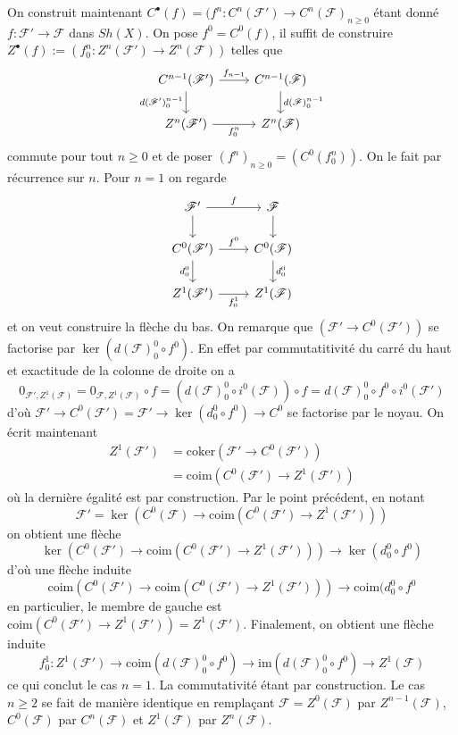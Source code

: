 \documentclass[a4paper,12pt]{article}
\newcommand{\F}{\mathscr F}
\newcommand{\im}{\textrm{im}}
\newcommand{\coker}{\textrm{coker}}
\newcommand{\coim}{\textrm{coim}}
\theoremstyle{plain}
\theoremstyle{definition}
\theoremstyle{remark}
\begin{document}
On construit maintenant 
$C^\bullet(f)=(f^n\colon C^n(\F')\to C^n(\F)_{n\geq 0}$ 
étant donné $f \colon \F'\to \F$ dans $Sh(X)$. On pose
$f^0=C^0(f)$, il suffit de construire $Z^\bullet(f):=
(f_0^n\colon Z^n(\F')\to Z^n(\F))$ telles que 
\[\begin{tikzcd}
	{C^{n-1}(\F')} & {C^{n-1}(\F)} \\
	{Z^n(\F')} & {Z^n(\F)}
	\arrow["{f_{n-1}}", from=1-1, to=1-2]
	\arrow["{d(\F')_0^{n-1}}"', from=1-1, to=2-1]
	\arrow["{d(\F)_0^{n-1}}", from=1-2, to=2-2]
	\arrow["{f_0^{n}}"', from=2-1, to=2-2]
\end{tikzcd}\]
commute pour tout $n\geq 0$ et de poser $(f^n)_{n\geq0}=(C^0(f_0^n))$.
On le fait par récurrence sur $n$. Pour $n=1$ on regarde
\[\begin{tikzcd}
	{\F'} & \F \\
	{C^{0}(\F')} & {C^{0}(\F)} \\
	{Z^1(\F')} & {Z^1(\F)}
	\arrow["f", from=1-1, to=1-2]
	\arrow[from=1-1, to=2-1]
	\arrow[from=1-2, to=2-2]
	\arrow["{f^0}", from=2-1, to=2-2]
	\arrow["{d_0^{0}}"', from=2-1, to=3-1]
	\arrow["{d_0^{0}}", from=2-2, to=3-2]
	\arrow["{f_0^1}"', from=3-1, to=3-2]
\end{tikzcd}\]
et on veut construire la flèche du bas. On remarque que
$(\F'\to C^0(\F'))$ se factorise par $\ker(d(\F)_0^0\circ f^0)$. En effet
par commutatitivité du carré du haut et exactitude de la colonne de
droite on a
\[0_{\F',Z^1(\F)}=0_{\F,Z^1(\F)}\circ f=(d(\F)_0^0\circ i^0(\F))\circ f=d(\F)_0^0\circ f^0\circ
i^0(\F')\] 
d'où $\F'\to C^0(\F')=\F'\to\ker(d_0^0\circ f^0)\to C^0$
se factorise par le noyau. On écrit maintenant
\begin{align*}
	Z^1(\F')&=\coker(\F'\to C^0(\F'))\\
		&=\coim(C^0(\F')\to Z^1(\F'))
\end{align*}
où la dernière égalité est par construction. Par le point précédent,
en notant 
\[\F'=\ker\left(C^0(\F)\to \coim(C^0(\F')\to Z^1(\F'))\right)\]
on obtient une flèche
\[\ker\left(C^0(\F')\to \coim(C^0(\F')\to Z^1(\F'))\right)\to \ker(d_0^0\circ f^0)\]
d'où une flèche induite 
\[\coim\left(C^0(\F')\to \coim(C^0(\F')\to Z^1(\F'))\right)\to \coim(d_0^0\circ f^0\]
en particulier, le membre de gauche est 
$\coim(C^0(\F')\to Z^1(\F'))=Z^1(\F')$. Finalement, on obtient
une flèche induite
\[f_0^1\colon Z^1(\F')\to \coim(d(\F)_0^0\circ f^0)\to\im(d(\F)_0^0\circ f^0) \to Z^1(\F)\] 
ce qui conclut le cas $n=1$. La commutativité étant par construction.
Le cas $n\geq 2$ se fait de manière identique en remplaçant $\F=Z^0(\F)$
par $Z^{n-1}(\F)$, $C^0(\F)$ par $C^n(\F)$ et $Z^1(\F)$ par $Z^n(\F)$.
\newline
\end{document}

